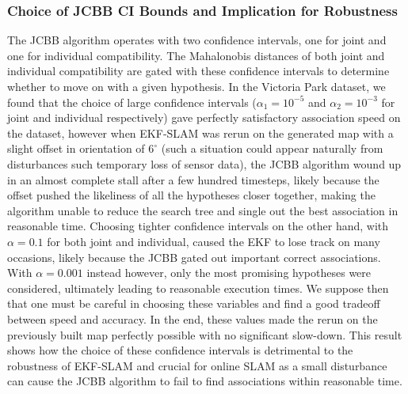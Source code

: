 \subsubsection{Choice of JCBB CI Bounds and Implication for Robustness}
The JCBB algorithm operates with two confidence intervals, one for joint and one for individual compatibility. The Mahalonobis distances of both joint and individual compatibility are gated with these confidence intervals to determine whether to move on with a given hypothesis.\cite{jcbb} In the Victoria Park dataset, we found that the choice of large confidence intervals ($\alpha_1 = 10^{-5}$ and $\alpha_2 = 10^{-3}$ for joint and individual respectively) gave perfectly satisfactory association speed on the dataset, however when EKF-SLAM was rerun on the generated map with a slight offset in orientation of $6^\circ$ (such a situation could appear naturally from disturbances such temporary loss of sensor data), the JCBB algorithm wound up in an almost complete stall after a few hundred timesteps, likely because the offset pushed the likeliness of all the hypotheses closer together, making the algorithm unable to reduce the search tree and single out the best association in reasonable time. Choosing tighter confidence intervals on the other hand, with $\alpha = 0.1$ for both joint and individual, caused the EKF to lose track on many occasions, likely because the JCBB gated out important correct associations. With $\alpha = 0.001$ instead however, only the most promising hypotheses were considered, ultimately leading to reasonable execution times. We suppose then that one must be careful in choosing these variables and find a good tradeoff between speed and accuracy. In the end, these values made the rerun on the previously built map perfectly possible with no significant slow-down. This result shows how the choice of these confidence intervals is detrimental to the robustness of EKF-SLAM and crucial for online SLAM as a small disturbance can cause the JCBB algorithm to fail to find associations within reasonable time.

